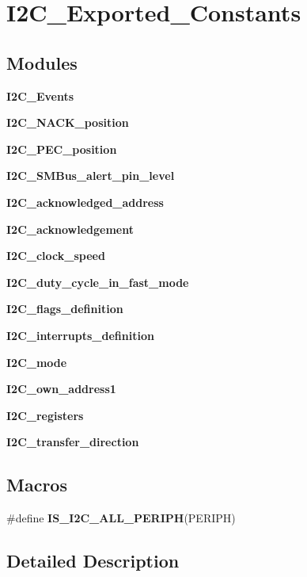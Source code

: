 \section{I2\+C\+\_\+\+Exported\+\_\+\+Constants}
\label{group__I2C__Exported__Constants}
\subsection*{Modules}
\begin{DoxyCompactItemize}
\item 
\textbf{ I2\+C\+\_\+\+Events}
\item 
\textbf{ I2\+C\+\_\+\+N\+A\+C\+K\+\_\+position}
\item 
\textbf{ I2\+C\+\_\+\+P\+E\+C\+\_\+position}
\item 
\textbf{ I2\+C\+\_\+\+S\+M\+Bus\+\_\+alert\+\_\+pin\+\_\+level}
\item 
\textbf{ I2\+C\+\_\+acknowledged\+\_\+address}
\item 
\textbf{ I2\+C\+\_\+acknowledgement}
\item 
\textbf{ I2\+C\+\_\+clock\+\_\+speed}
\item 
\textbf{ I2\+C\+\_\+duty\+\_\+cycle\+\_\+in\+\_\+fast\+\_\+mode}
\item 
\textbf{ I2\+C\+\_\+flags\+\_\+definition}
\item 
\textbf{ I2\+C\+\_\+interrupts\+\_\+definition}
\item 
\textbf{ I2\+C\+\_\+mode}
\item 
\textbf{ I2\+C\+\_\+own\+\_\+address1}
\item 
\textbf{ I2\+C\+\_\+registers}
\item 
\textbf{ I2\+C\+\_\+transfer\+\_\+direction}
\end{DoxyCompactItemize}
\subsection*{Macros}
\begin{DoxyCompactItemize}
\item 
\#define \textbf{ I\+S\+\_\+\+I2\+C\+\_\+\+A\+L\+L\+\_\+\+P\+E\+R\+I\+PH}(P\+E\+R\+I\+PH)
\end{DoxyCompactItemize}


\subsection{Detailed Description}


